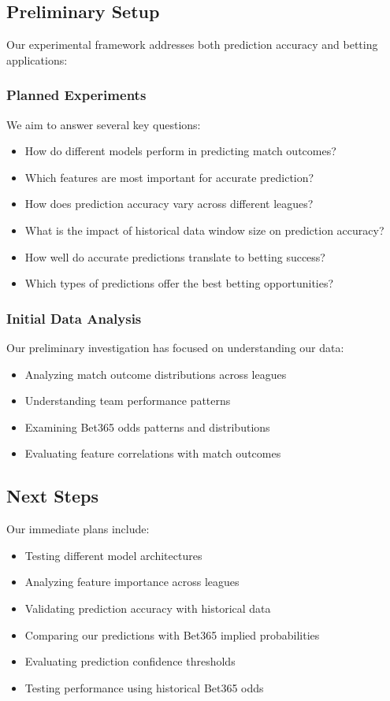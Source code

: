 \documentclass[conference]{IEEEtran}
\begin{document}
\subsection{Preliminary Setup}
Our experimental framework addresses both prediction accuracy and betting applications:

\subsubsection{Planned Experiments}
We aim to answer several key questions:
\begin{itemize}
\item How do different models perform in predicting match outcomes?
\item Which features are most important for accurate prediction?
\item How does prediction accuracy vary across different leagues?
\item What is the impact of historical data window size on prediction accuracy?
\item How well do accurate predictions translate to betting success?
\item Which types of predictions offer the best betting opportunities?
\end{itemize}

\subsubsection{Initial Data Analysis}
Our preliminary investigation has focused on understanding our data:
\begin{itemize}
\item Analyzing match outcome distributions across leagues
\item Understanding team performance patterns
\item Examining Bet365 odds patterns and distributions
\item Evaluating feature correlations with match outcomes
\end{itemize}

\subsection{Next Steps}
Our immediate plans include:
\begin{itemize}
\item Testing different model architectures
\item Analyzing feature importance across leagues
\item Validating prediction accuracy with historical data
\item Comparing our predictions with Bet365 implied probabilities
\item Evaluating prediction confidence thresholds
\item Testing performance using historical Bet365 odds
\end{itemize}
\end{document}

